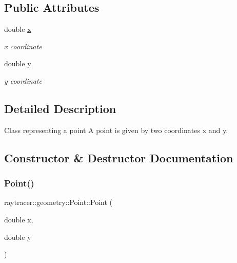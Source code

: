 \subsection*{Public Attributes}
\begin{DoxyCompactItemize}
\item 
\mbox{\label{classraytracer_1_1geometry_1_1Point_a1408a40033e6273f93e539875dfe09b3}} 
double \hyperlink{classraytracer_1_1geometry_1_1Point_a1408a40033e6273f93e539875dfe09b3}{x}
\begin{DoxyCompactList}\small\item\em x coordinate \end{DoxyCompactList}\item 
\mbox{\label{classraytracer_1_1geometry_1_1Point_a7fcd0651b22e64147a33dded20b72fd1}} 
double \hyperlink{classraytracer_1_1geometry_1_1Point_a7fcd0651b22e64147a33dded20b72fd1}{y}
\begin{DoxyCompactList}\small\item\em y coordinate \end{DoxyCompactList}\end{DoxyCompactItemize}


\subsection{Detailed Description}
Class representing a point A point is given by two coordinates x and y. 

\subsection{Constructor \& Destructor Documentation}
\mbox{\label{classraytracer_1_1geometry_1_1Point_ad05a2dc2f77d1a2720a6dd19a6b1c5ed}} 
\subsubsection{\texorpdfstring{Point()}{Point()}\hspace{0.1cm}{\footnotesize\ttfamily [1/2]}}
{\footnotesize\ttfamily raytracer\+::geometry\+::\+Point\+::\+Point (\begin{DoxyParamCaption}\item[{double}]{x,  }\item[{double}]{y }\end{DoxyParamCaption})}



